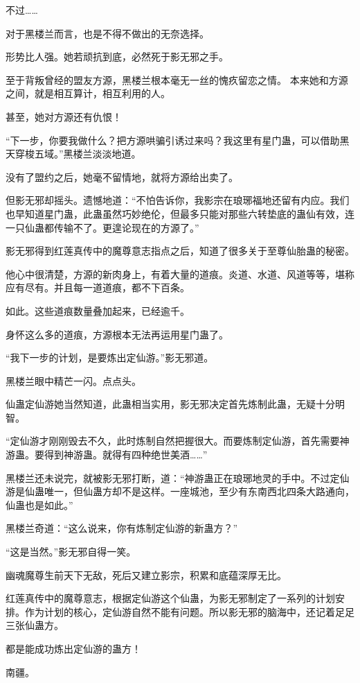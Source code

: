 \begin{this_body}
不过……

对于黑楼兰而言，也是不得不做出的无奈选择。

形势比人强。她若顽抗到底，必然死于影无邪之手。

至于背叛曾经的盟友方源，黑楼兰根本毫无一丝的愧疚留恋之情。 本来她和方源之间，就是相互算计，相互利用的人。

甚至，她对方源还有仇恨！

“下一步，你要我做什么？把方源哄骗引诱过来吗？我这里有星门蛊，可以借助黑天穿梭五域。”黑楼兰淡淡地道。

没有了盟约之后，她毫不留情地，就将方源给出卖了。

但影无邪却摇头。遗憾地道：“不怕告诉你，我影宗在琅琊福地还留有内应。我们也早知道星门蛊，此蛊虽然巧妙绝伦，但最多只能对那些六转垫底的蛊仙有效，连一只仙蛊都传输不了。更遑论现在的方源了。”

影无邪得到红莲真传中的魔尊意志指点之后，知道了很多关于至尊仙胎蛊的秘密。

他心中很清楚，方源的新肉身上，有着大量的道痕。炎道、水道、风道等等，堪称应有尽有。并且每一道道痕，都不下百条。

如此。这些道痕数量叠加起来，已经逾千。

身怀这么多的道痕，方源根本无法再运用星门蛊了。

“我下一步的计划，是要炼出定仙游。”影无邪道。

黑楼兰眼中精芒一闪。点点头。

仙蛊定仙游她当然知道，此蛊相当实用，影无邪决定首先炼制此蛊，无疑十分明智。

“定仙游才刚刚毁去不久，此时炼制自然把握很大。而要炼制定仙游，首先需要神游蛊。要得到神游蛊。就得有四种绝世美酒……”

黑楼兰还未说完，就被影无邪打断，道：“神游蛊正在琅琊地灵的手中。不过定仙游是仙蛊唯一，但仙蛊方却不是这样。一座城池，至少有东南西北四条大路通向，仙蛊也是如此。”

黑楼兰奇道：“这么说来，你有炼制定仙游的新蛊方？”

“这是当然。”影无邪自得一笑。

幽魂魔尊生前天下无敌，死后又建立影宗，积累和底蕴深厚无比。

红莲真传中的魔尊意志，根据定仙游这个仙蛊，为影无邪制定了一系列的计划安排。作为计划的核心，定仙游自然不能有问题。所以影无邪的脑海中，还记着足足三张仙蛊方。

都是能成功炼出定仙游的蛊方！

南疆。


\end{this_body}
